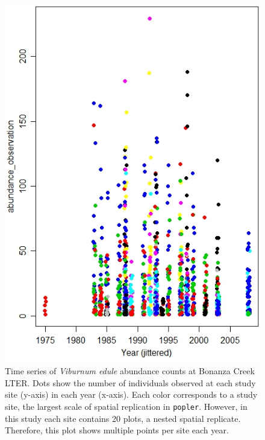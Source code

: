 \documentclass{article}\usepackage[]{graphicx}\usepackage[]{color}
\begin{document}
\newpage
\begin{figure}[h!]
  \begin{center}
    \includegraphics[scale=0.8]{BNZ_plot}
    \caption{Time series of \textit{Viburnum edule} abundance counts at Bonanza Creek LTER. Dots show the number of individuals observed at each study site (y-axis) in each year (x-axis). Each color corresponds to a study site, the largest scale of spatial replication in \texttt{popler}. However, in this study each site contains 20 plots, a nested spatial replicate. Therefore, this plot shows multiple points per site each year.}
    \label{Fig:BNZ_plot}
  \end{center}
\end{figure}
\end{document}

